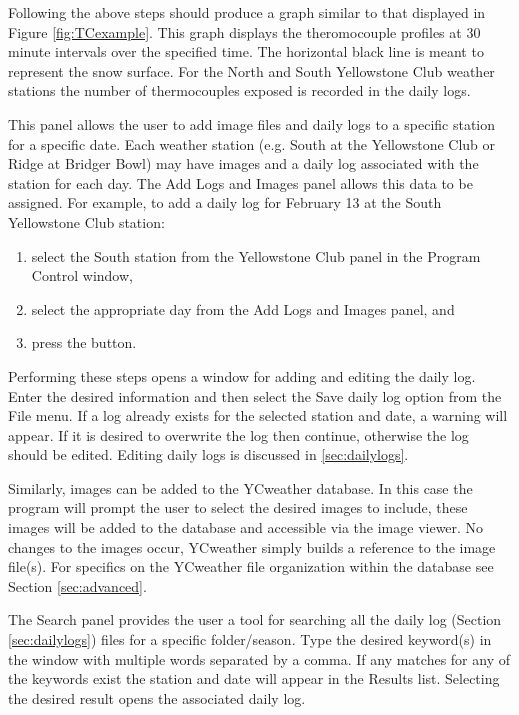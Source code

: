 Following the above steps should produce a graph similar to that displayed in Figure \ref{fig:TCexample}.  This graph displays the theromocouple profiles at 30 minute intervals over the specified time.  The horizontal black line is meant to represent the snow surface.  For the North and South Yellowstone Club weather stations the number of thermocouples exposed is recorded in the daily logs.

\label{sec:add}
This panel allows the user to add image files and daily logs to a specific station for a specific date.  Each weather station (e.g. South at the Yellowstone Club or Ridge at Bridger Bowl) may have images and a daily log associated with the station for each day.  The Add Logs and Images panel allows this data to be assigned.  For example, to add a daily log for February 13 at the South Yellowstone Club station:
\begin{enumerate}
	\item select the South station from the Yellowstone Club panel in the Program Control window,
	\item select the appropriate day from the Add Logs and Images panel, and
	\item press the  button.
\end{enumerate}

Performing these steps opens a window for adding and editing the daily log.  Enter the desired information and then select the Save daily log option from the File menu.  If a log already exists for the selected station and date, a warning will appear.  If it is desired to overwrite the log then continue, otherwise the log should be edited.  Editing daily logs is discussed in \ref{sec:dailylogs}.

Similarly, images can be added to the YCweather database.  In this case the program will prompt the user to select the desired images to include, these images will be added to the database and accessible via the image viewer.  No changes to the images occur, YCweather simply builds a reference to the image file(s).  For specifics on the YCweather file organization within the database see Section \ref{sec:advanced}.

The Search panel provides the user a tool for searching all the daily log (Section \ref{sec:dailylogs}) files for a specific folder/season.  Type the desired keyword(s) in the window with multiple words separated by a comma.  If any matches for any of the keywords exist the station and date will appear in the Results list.  Selecting the desired result opens the associated daily log.
